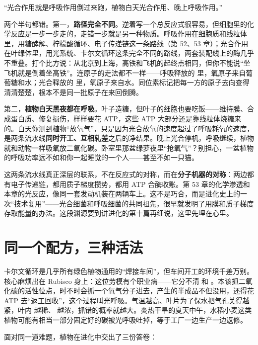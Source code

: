 \begin{wuqu}
“光合作用就是呼吸作用倒过来跑，植物白天光合作用、晚上呼吸作用。”

两个半句都错。第一，\textbf{路径完全不同}。逆着写一个总反应式很容易，但细胞里的化学反应是一步一步走的，走错一步就是另一种物质。呼吸作用在细胞质和线粒体里，用糖酵解、柠檬酸循环、电子传递链这一条路线（第 52、53 章）；光合作用在叶绿体里，用光系统、卡尔文循环这条完全不同的路线，两套装配线上的酶几乎不重叠。打个比方说：从北京到上海，高铁和飞机的起终点相同，但你不能说“坐飞机就是倒着坐高铁”。连原子的走法都不一样——呼吸释放的  里，氧原子来自葡萄糖和水；光合释放的  里，氧原子来自水。同位素标记把每一方的原子去向查得清清楚楚，根本不是同一批原子在来回倒腾。

第二，\textbf{植物白天黑夜都在呼吸}。叶子造糖，但叶子的细胞也要吃饭——维持膜、合成蛋白质、修复损伤，样样要花 ATP，这些 ATP 大部分还是靠线粒体烧糖来的。白天你测到植物“放氧气”，只是因为光合放氧的速度超过了呼吸耗氧的速度，是两条流水线\textbf{同时开工、互相轧差}之后的净结果。晚上光合停机，呼吸继续，植物就和动物一样吸氧放二氧化碳。卧室里那盆绿萝夜里“抢氧气”？别担心，一盆植物的呼吸功率远不如和你一起睡觉的一个人——甚至不如一只猫。
\end{wuqu}

这两条流水线真正深层的联系，不在反应式的对称，而在\textbf{分子机器的对称}：两边都有电子传递链，都用质子梯度攒势，都用 ATP 合酶收账。第 53 章的化学渗透和本章的光反应，像同一套发动机装在两辆车上。这不是巧合，而是进化史上的一次“技术复用”——光合细菌和呼吸细菌的共同祖先，很早就发明了用膜和质子梯度存取能量的办法。这段渊源要到讲进化的第十篇再细说，这里先埋在心里。

\section{同一个配方，三种活法}

卡尔文循环是几乎所有绿色植物通用的“焊接车间”，但车间开工的环境千差万别。核心麻烦出在 Rubisco 身上：这位劳模有个职业病——它分不清  和 。本该抓二氧化碳的活性位点，时不时会抓一个氧气分子进去，产生的半成品不但没用，还得花 ATP 去“返工回收”，这个过程叫光呼吸。气温越高、叶片为了保水把气孔关得越紧，叶内  越稀、 越浓，抓错的概率就越大。炎热干旱的夏天中午，水稻小麦这类植物可能有相当一部分固定好的碳被光呼吸吐掉，等于工厂一边生产一边返修。

面对同一道难题，植物在进化中交出了三份答卷：


